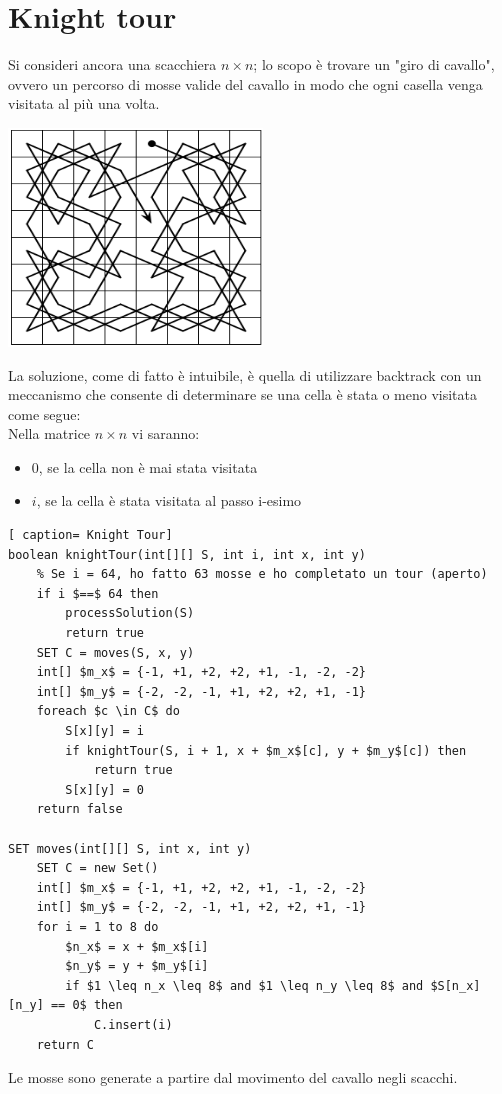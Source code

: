 \documentclass[../cheatSheetAlgoritmi.tex]{subfiles}
\begin{document}
\section{Knight tour}
Si consideri ancora una scacchiera $n \times n$; lo scopo è trovare un "giro di cavallo", ovvero un percorso di mosse valide del cavallo in modo che ogni casella venga visitata al più una volta.
\begin{center}
	\includegraphics{../img/backtracking_knight_tour}
\end{center}
La soluzione, come di fatto è intuibile, è quella di utilizzare backtrack con un meccanismo che consente di determinare se una cella è stata o meno visitata come segue: \\
Nella matrice $n \times n$ vi saranno:
\begin{itemize}
	\item 0, se la cella non è mai stata visitata
	\item $i$, se la cella è stata visitata al passo i-esimo
\end{itemize}
 \begin{lstlisting}[ caption= Knight Tour]
boolean knightTour(int[][] S, int i, int x, int y)
	% Se i = 64, ho fatto 63 mosse e ho completato un tour (aperto)
	if i $==$ 64 then
		processSolution(S)
		return true
	SET C = moves(S, x, y)
	int[] $m_x$ = {-1, +1, +2, +2, +1, -1, -2, -2}
	int[] $m_y$ = {-2, -2, -1, +1, +2, +2, +1, -1}
	foreach $c \in C$ do
		S[x][y] = i
		if knightTour(S, i + 1, x + $m_x$[c], y + $m_y$[c]) then
			return true
		S[x][y] = 0
	return false
	
SET moves(int[][] S, int x, int y)
	SET C = new Set()
	int[] $m_x$ = {-1, +1, +2, +2, +1, -1, -2, -2}
	int[] $m_y$ = {-2, -2, -1, +1, +2, +2, +1, -1}
	for i = 1 to 8 do
		$n_x$ = x + $m_x$[i]
		$n_y$ = y + $m_y$[i]
		if $1 \leq n_x \leq 8$ and $1 \leq n_y \leq 8$ and $S[n_x][n_y] == 0$ then
			C.insert(i)
	return C
\end{lstlisting}
Le mosse sono generate a partire dal movimento del cavallo negli scacchi. \\
\end{document}
